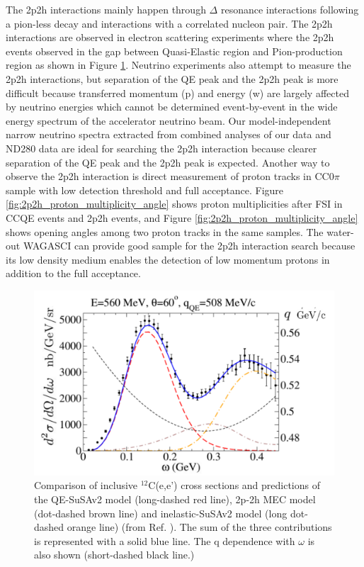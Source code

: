 The 2p2h interactions mainly happen through $\Delta$ resonance interactions following a pion-less decay and interactions with a correlated nucleon pair.
The 2p2h interactions are observed in electron scattering experiments \cite{escattering} where the 2p2h events observed in the gap between Quasi-Elastic region and Pion-production region as shown in Figure \ref{fig:electrono_scattering_data}.
Neutrino experiments also attempt to measure the 2p2h interactions, but separation of the QE peak and the 2p2h peak is more difficult because transferred momentum (p) and energy (w) are largely affected by  neutrino energies which cannot be determined event-by-event in the wide energy spectrum of the accelerator neutrino beam.
Our model-independent narrow neutrino spectra extracted from combined analyses of our data and ND280 data are ideal for searching the 2p2h interaction because clearer separation of the QE peak and the 2p2h peak is expected.
Another way to observe the 2p2h interaction is direct measurement of proton tracks in CC0$\pi$ sample with low detection threshold and full acceptance.
Figure \ref{fig:2p2h_proton_multiplicity_angle} shows proton multiplicities after FSI in CCQE events and 2p2h events, and Figure \ref{fig:2p2h_proton_multiplicity_angle} shows opening angles among two proton tracks in the same samples.
The water-out WAGASCI can provide good sample for the 2p2h interaction search because its low density medium enables the detection of low momentum protons in addition to the full acceptance.

\begin{figure}[tbh]
\begin{center}
\includegraphics[width=0.6\linewidth]{fig/escattering.pdf}
\end{center}
\caption{
Comparison of inclusive $^{12}$C(e,e') cross sections and predictions of the QE-SuSAv2 model (long-dashed red line), 2p-2h MEC model (dot-dashed brown line) and inelastic-SuSAv2 model (long dot-dashed orange line) (from Ref. \cite{escattering}).
The sum of the three contributions is represented with a solid blue line.
The q dependence with $\omega$ is also shown (short-dashed black line.)
}
\label{fig:electrono_scattering_data}
\end{figure}

